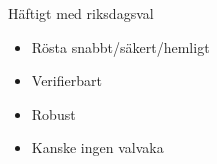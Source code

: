 \begin{frame}{Häftigt med riksdagsval}

\begin{itemize}
\item Rösta snabbt/säkert/hemligt
\item Verifierbart
\item Robust
\item Kanske ingen valvaka
\end{itemize}

\end{frame}